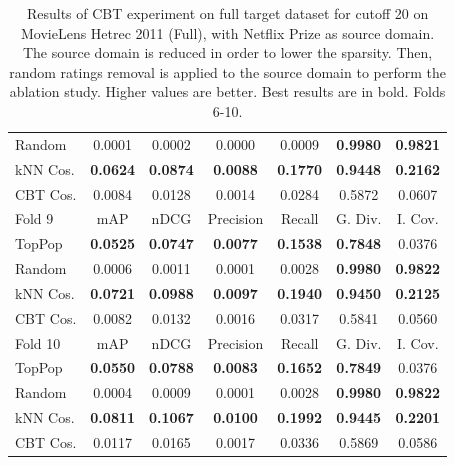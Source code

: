 \begin{table}[hbt]
\begin{tabulary}{\textwidth}{|L|CCCCCC|}
Random & 0.0001 &           0.0002 &           0.0000 &           0.0009 &                                  \textbf{0.9980} &                                   \textbf{0.9821} \\
kNN Cos. & \textbf{0.0624} &  \textbf{0.0874} &  \textbf{0.0088} &  \textbf{0.1770} &                                  \textbf{0.9448} &                                   \textbf{0.2162} \\
CBT Cos. & 0.0084 &           0.0128 &           0.0014 &           0.0284 &                                           0.5872 &                                            0.0607 \\
\hline
\hline
Fold 9 & mAP & nDCG & Precision & Recall & G. Div. & I. Cov. \\
\hline
TopPop & \textbf{0.0525} &  \textbf{0.0747} &  \textbf{0.0077} &  \textbf{0.1538} &                                  \textbf{0.7848} &                                            0.0376 \\
Random & 0.0006 &           0.0011 &           0.0001 &           0.0028 &                                  \textbf{0.9980} &                                   \textbf{0.9822} \\
kNN Cos. & \textbf{0.0721} &  \textbf{0.0988} &  \textbf{0.0097} &  \textbf{0.1940} &                                  \textbf{0.9450} &                                   \textbf{0.2125} \\
CBT Cos. & 0.0082 &           0.0132 &           0.0016 &           0.0317 &                                           0.5841 &                                            0.0560 \\
\hline
\hline
Fold 10 & mAP & nDCG & Precision & Recall & G. Div. & I. Cov. \\
\hline
TopPop & \textbf{0.0550} &  \textbf{0.0788} &  \textbf{0.0083} &  \textbf{0.1652} &                                  \textbf{0.7849} &                                            0.0376 \\
Random & 0.0004 &           0.0009 &           0.0001 &           0.0028 &                                  \textbf{0.9980} &                                   \textbf{0.9822} \\
kNN Cos. & \textbf{0.0811} &  \textbf{0.1067} &  \textbf{0.0100} &  \textbf{0.1992} &                                  \textbf{0.9445} &                                   \textbf{0.2201} \\
CBT Cos. & 0.0117 &           0.0165 &           0.0017 &           0.0336 &                                           0.5869 &                                            0.0586 \\
\hline
\end{tabulary}
\caption{Results of CBT experiment on full target dataset for cutoff 20 on MovieLens Hetrec 2011 (Full), with Netflix Prize as source domain. The source domain is reduced in order to lower the sparsity. Then, random ratings removal is applied to the source domain to perform the ablation study. Higher values are better. Best results are in bold. Folds 6-10.}
\end{table}


